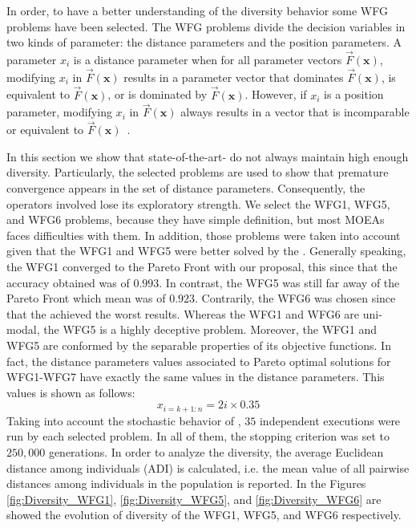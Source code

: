 In order, to have a better understanding of the diversity behavior some WFG problems have been selected.
%
The WFG problems divide the decision variables in two kinds of parameter: the distance parameters and the position parameters.
%
A parameter $x_i$ is a distance parameter when for all parameter vectors $\vec{F}(\mathbf{x})$, modifying $x_i$ in $\vec{F}(\mathbf{x})$ results in a parameter vector that dominates $\vec{F}(\mathbf{x})$, is equivalent to $\vec{F}(\mathbf{x})$, or is dominated by $\vec{F}(\mathbf{x})$.
%
However, if $x_i$ is a position parameter, modifying $x_i$ in $\vec{F}(\mathbf{x})$ always results in a vector that is incomparable or equivalent to $\vec{F}(\mathbf{x})$~\cite{huband2005scalable}.
%

In this section we show that state-of-the-art-\MOEAS{} do not always maintain high enough diversity.
%
Particularly, the selected problems are used to show that premature convergence appears in the set of distance parameters.
%
Consequently, the operators involved lose its exploratory strength.
%
We select the WFG1, WFG5, and WFG6 problems, because they have simple definition, but most MOEAs faces difficulties with them. 
%
In addition, those problems were taken into account given that the WFG1 and WFG5 were better solved by the \VSDMOEA{}.
%
Generally speaking, the WFG1 converged to the Pareto Front with our proposal, this since that the accuracy obtained was of $0.993$.
%
In contrast, the WFG5 was still far away of the Pareto Front which \HV{} mean  was of $0.923$.
%
Contrarily, the WFG6 was chosen since that the \VSDMOEA{} achieved the worst results.
%
Whereas the WFG1 and WFG6 are uni-modal, the WFG5 is a highly deceptive problem.
%
Moreover, the WFG1 and WFG5 are conformed by the separable properties of its objective functions.
%
In fact, the distance parameters values associated to Pareto optimal solutions for WFG1-WFG7 have exactly the same values in the distance parameters.
%
This values is shown as follows:
\begin{equation}
   x_{i=k+1:n} = 2i \times 0.35
\end{equation}
%
Taking into account the stochastic behavior of \MOEAS{}, $35$ independent executions were run by each selected problem.
%
In all of them, the stopping criterion was set to $250,000$ generations.
%
In order to analyze the diversity, the average Euclidean distance among individuals (ADI) is calculated, i.e. the mean value of all pairwise distances among individuals in the population is reported.
%
In the Figures \ref{fig:Diversity_WFG1}, \ref{fig:Diversity_WFG5}, and \ref{fig:Diversity_WFG6} are showed the evolution of diversity of the WFG1, WFG5, and WFG6 respectively.
